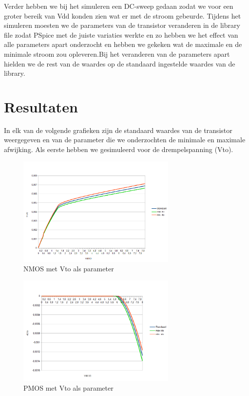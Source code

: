 \documentclass{article}
\begin{document}
Verder hebben we bij het simuleren een DC-sweep gedaan zodat we voor een groter bereik van Vdd konden zien wat er met de stroom gebeurde.
Tijdens het simuleren moesten we de parameters van de transistor veranderen in de library file zodat PSpice met de juiste variaties werkte en zo hebben we het effect van alle parameters apart onderzocht en hebben we gekeken wat de maximale en de minimale stroom zou opleveren.Bij het veranderen van de parameters apart hielden we de rest van de waardes op de standaard ingestelde waardes van de library.

\clearpage

\section{Resultaten}

In elk van de volgende grafieken zijn de standaard waardes van de transistor weergegeven en van de parameter die we onderzochten de minimale en maximale afwijking.
Als eerste hebben we gesimuleerd voor de drempelspanning (Vto).

\begin{figure}[H]
	\centering
	\includegraphics[width=0.7\textwidth]{nmosvto}
	\caption{NMOS met Vto als parameter}
\end{figure}

\begin{figure}[H]
	\centering
	\includegraphics[width=0.7\textwidth]{pmosvto}
	\caption{PMOS met Vto als parameter}
\end{figure}
\clearpage
\end{document}
